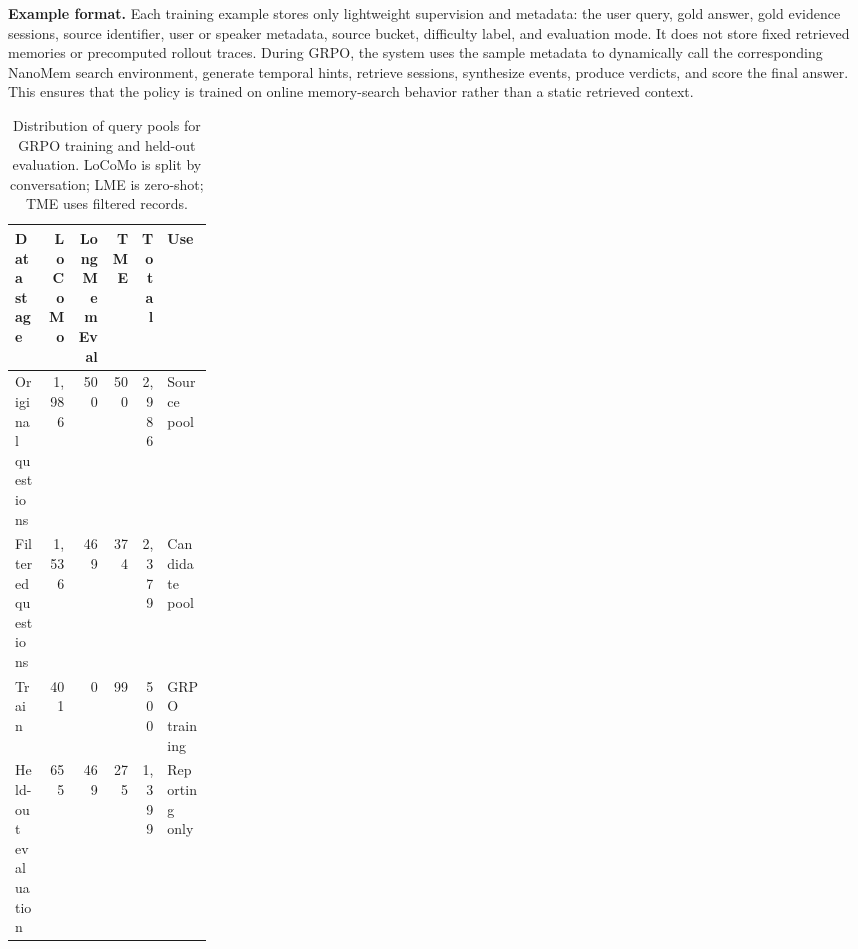 \textbf{Example format.}
Each training example stores only lightweight supervision and metadata: the user
query, gold answer, gold evidence sessions, source identifier, user or speaker
metadata, source bucket, difficulty label, and evaluation mode. It does not store
fixed retrieved memories or precomputed rollout traces. During GRPO, the system
uses the sample metadata to dynamically call the corresponding NanoMem search
environment, generate temporal hints, retrieve sessions, synthesize events,
produce verdicts, and score the final answer. This ensures that the policy is
trained on online memory-search behavior rather than a static retrieved context.

\begin{table}[h]
\centering
\footnotesize
\setlength{\tabcolsep}{3pt}
\begin{tabular}{@{}lrrrrp{0.23\linewidth}@{}}
\toprule
\textbf{Data stage} & \textbf{LoCoMo} & \textbf{LongMemEval} &
\textbf{TME} & \textbf{Total} & \textbf{Use} \\
\midrule
Original questions & 1,986 & 500 & 500 & 2,986 & Source pool \\
Filtered questions & 1,536 & 469 & 374 & 2,379 & Candidate pool \\
Train & 401 & 0 & 99 & 500 & GRPO training \\
Held-out evaluation & 655 & 469 & 275 & 1,399 & Reporting only \\
\bottomrule
\end{tabular}
\caption{Distribution of query pools for GRPO training and held-out evaluation.
LoCoMo is split by conversation; LME is zero-shot; TME uses filtered records.}
\label{tab:train-valid-data-distribution}
\end{table}

